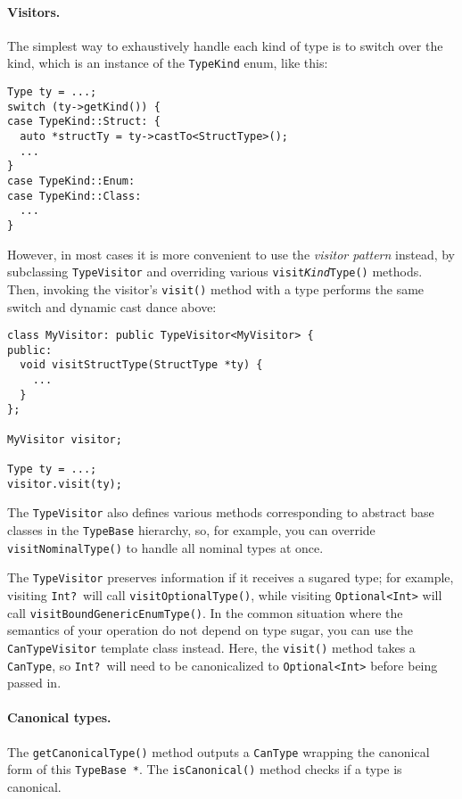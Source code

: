 \documentclass[../generics]{subfiles}
\begin{document}
\paragraph{Visitors.}
The simplest way to exhaustively handle each kind of type is to switch over the kind, which is an instance of the \texttt{TypeKind} enum, like this:
\begin{Verbatim}
Type ty = ...;
switch (ty->getKind()) {
case TypeKind::Struct: {
  auto *structTy = ty->castTo<StructType>();
  ...
}
case TypeKind::Enum:
case TypeKind::Class:
  ...
}
\end{Verbatim}
However, in most cases it is more convenient to use the \emph{visitor pattern} instead, by subclassing \texttt{TypeVisitor} and overriding various \texttt{visit\emph{Kind}Type()} methods. Then, invoking the visitor's \texttt{visit()} method with a type performs the same switch and dynamic cast dance above:
\begin{Verbatim}
class MyVisitor: public TypeVisitor<MyVisitor> {
public:
  void visitStructType(StructType *ty) {
    ...
  }
};

MyVisitor visitor;

Type ty = ...;
visitor.visit(ty);
\end{Verbatim}
The \texttt{TypeVisitor} also defines various methods corresponding to abstract base classes in the \texttt{TypeBase} hierarchy, so, for example, you can override \texttt{visitNominalType()} to handle all nominal types at once.

The \texttt{TypeVisitor} preserves information if it receives a sugared type; for example, visiting \texttt{Int?}\ will call \texttt{visitOptionalType()}, while visiting \texttt{Optional<Int>} will call \texttt{visitBoundGenericEnumType()}. In the common situation where the semantics of your operation do not depend on type sugar, you can use the \texttt{CanTypeVisitor} template class instead. Here, the \texttt{visit()} method takes a \texttt{CanType}, so \texttt{Int?}\ will need to be canonicalized to \texttt{Optional<Int>} before being passed in.

\paragraph{Canonical types.}
The \texttt{getCanonicalType()} method outputs a \texttt{CanType} wrapping the canonical form of this \texttt{TypeBase *}. The \texttt{isCanonical()} method checks if a type is canonical.
\end{document}

